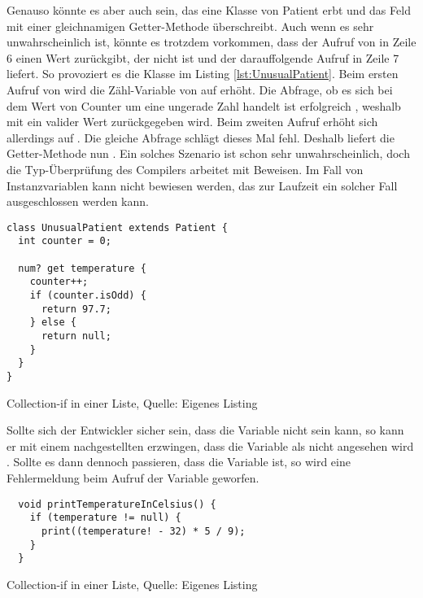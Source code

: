 Genauso könnte es aber auch sein, das eine Klasse von Patient erbt und das Feld  mit einer gleichnamigen Getter-Methode überschreibt. Auch wenn es sehr unwahrscheinlich ist, könnte es trotzdem vorkommen, dass der Aufruf von  in Zeile 6 einen Wert zurückgibt, der nicht  ist und der darauffolgende Aufruf in Zeile 7  liefert. So provoziert es die Klasse  im Listing \ref{lst:UnusualPatient}. Beim ersten Aufruf von  wird die Zähl-Variable  von  auf  erhöht. Die Abfrage, ob es sich bei dem Wert von Counter um eine ungerade Zahl handelt ist erfolgreich , weshalb mit  ein valider Wert zurückgegeben wird. Beim zweiten Aufruf erhöht sich  allerdings auf . Die gleiche Abfrage schlägt dieses Mal fehl. Deshalb liefert die Getter-Methode nun  . Ein solches Szenario ist schon sehr unwahrscheinlich, doch die Typ-Überprüfung des Compilers arbeitet mit Beweisen. Im Fall von Instanzvariablen kann nicht bewiesen werden, das zur Laufzeit ein solcher Fall ausgeschlossen werden kann.

\ifincludeall
    \begin{listing}[ht]
        \begin{verbatim}
class UnusualPatient extends Patient {
  int counter = 0;

  num? get temperature {
    counter++;
    if (counter.isOdd) {
      return 97.7;
    } else {
      return null;
    }
  }
}
\end{verbatim}
        \caption[Collection-if in einer Liste]{Collection-if in einer Liste, Quelle: Eigenes Listing}
        \label{lst:UnusualPatient}
    \end{listing}
\fi


Sollte sich der Entwickler sicher sein, dass die Variable nicht  sein kann, so kann er mit einem nachgestellten \IC{!} erzwingen, dass die Variable als nicht  angesehen wird . Sollte es dann dennoch passieren, dass die Variable  ist, so wird eine Fehlermeldung beim Aufruf der Variable geworfen.

\ifincludeall
    \begin{listing}[ht]
        \begin{verbatim}
  void printTemperatureInCelsius() {
    if (temperature != null) {
      print((temperature! - 32) * 5 / 9);
    }
  }
    \end{verbatim}
        \caption[Collection-if in einer Liste]{Collection-if in einer Liste, Quelle: Eigenes Listing}
        \label{lst:printTemperatureInCelsiusLocalVariableForceNullCheck}
    \end{listing}
\fi

